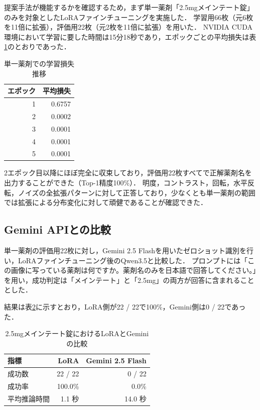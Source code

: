 \documentclass{jsarticle}
\begin{document}
提案手法が機能するかを確認するため，まず単一薬剤「2.5mgメインテート錠」のみを対象としたLoRAファインチューニングを実施した．
学習用66枚（元6枚を11倍に拡張），評価用22枚（元2枚を11倍に拡張）を用いた．
NVIDIA CUDA環境において学習に要した時間は15分18秒であり，エポックごとの平均損失は表\ref{tab:loss_meinte}のとおりであった．

\begin{table}[h]
\centering
\caption{単一薬剤での学習損失推移}
\label{tab:loss_meinte}
\begin{tabular}{rr}
\hline
エポック & 平均損失 \\
\hline
1 & 0.6757 \\
2 & 0.0002 \\
3 & 0.0001 \\
4 & 0.0001 \\
5 & 0.0001 \\
\hline
\end{tabular}
\end{table}

2エポック目以降にほぼ完全に収束しており，評価用22枚すべてで正解薬剤名を出力することができた（Top-1精度100\%）．
明度，コントラスト，回転，水平反転，ノイズの全拡張パターンに対して正答しており，少なくとも単一薬剤の範囲では拡張による分布変化に対して頑健であることが確認できた．

\subsection{Gemini APIとの比較}

単一薬剤の評価用22枚に対し，Gemini 2.5 Flashを用いたゼロショット識別を行い，LoRAファインチューニング後のQwen3.5と比較した．
プロンプトには「この画像に写っている薬剤は何ですか。薬剤名のみを日本語で回答してください。」を用い，成功判定は「メインテート」と「2.5mg」の両方が回答に含まれることとした．

結果は表\ref{tab:vs_gemini}に示すとおり，LoRA側が22 / 22で100\%，Gemini側は0 / 22であった．

\begin{table}[h]
\centering
\caption{2.5mgメインテート錠におけるLoRAとGeminiの比較}
\label{tab:vs_gemini}
\begin{tabular}{lrr}
\hline
指標 & LoRA & Gemini 2.5 Flash \\
\hline
成功数 & 22 / 22 & 0 / 22 \\
成功率 & 100.0\% & 0.0\% \\
平均推論時間 & 1.1 秒 & 14.0 秒 \\
\hline
\end{tabular}
\end{table}
\end{document}
